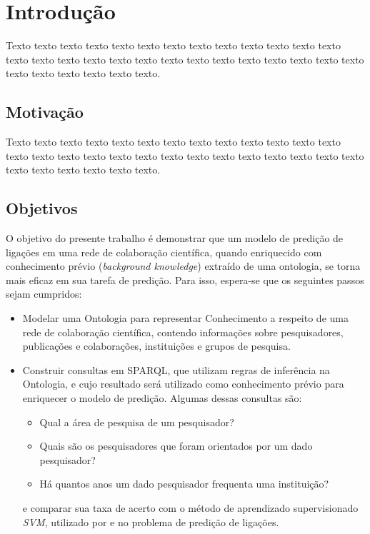 \chapter{Introdução}
\label{cap:introducao}

Texto texto texto texto texto texto texto texto texto texto texto texto texto
texto texto texto texto texto texto texto texto texto texto texto texto texto
texto texto texto texto texto texto texto.



\section{Motivação}
\label{sec:motivacao}

Texto texto texto texto texto texto texto texto texto texto texto texto texto
texto texto texto texto texto texto texto texto texto texto texto texto texto
texto texto texto texto texto texto texto.


\section{Objetivos}
\label{sec:objetivos}

O objetivo do presente trabalho é demonstrar que um modelo de predição de ligações em uma rede de colaboração científica, quando enriquecido com conhecimento prévio (\textit{background knowledge}) extraído de uma ontologia, se torna mais eficaz em sua tarefa de predição.
Para isso, espera-se que os seguintes passos sejam cumpridos:

\begin{itemize}
    \item Modelar uma Ontologia para representar Conhecimento a respeito de uma rede de colaboração científica, contendo informações sobre pesquisadores, publicações e colaborações, instituições e grupos de pesquisa.
    \item Construir consultas em SPARQL, que utilizam regras de inferência na Ontologia, e cujo resultado será utilizado como conhecimento prévio para enriquecer o modelo de predição. Algumas dessas consultas são:
    \begin{itemize}
        \item Qual a área de pesquisa de um pesquisador?
        \item Quais são os pesquisadores que foram orientados por um dado pesquisador?
        \item Há quantos anos um dado pesquisador frequenta uma instituição?
    \end{itemize}
    e comparar sua taxa de acerto com o método
    de aprendizado supervisionado \textit{SVM}, utilizado por \citet{MohammadAlHasan} e
    \citet{Cervantes2014} no problema de predição de ligações.
\end{itemize}

